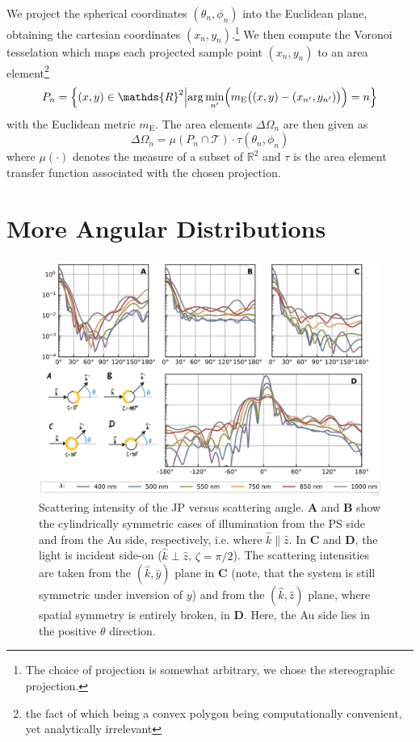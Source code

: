 \documentclass[10pt]{article}
\begin{document}
We project the spherical coordinates $\left( \theta_n, \phi_n \right)$ into the Euclidean plane, obtaining the cartesian coordinates $(x_n, y_n)$.\footnote{The choice of projection is somewhat arbitrary, we chose the stereographic projection.} 
We then compute the Voronoi tesselation which maps each projected sample point $(x_n, y_n)$ to an area element\footnote{the fact of which being a convex polygon being computationally convenient, yet analytically irrelevant} 
$$
P_n = \left\lbrace 
(x,y) \in \mathds{R}^2 
\middle\vert 
\mathrm{arg}\min\limits_{n'} \Bigl( m_\mathrm{E}\bigl( (x,y)-(x_{n'},y_{n'}) \bigr) \Bigr)
= n
\right\rbrace
$$ 
with the Euclidean metric $m_\mathrm{E}$. 
The area elements $\Delta\Omega_n$ are then given as 
$$
\Delta\Omega_n
=
\mu\left(
P_n \cap \mathcal{T}
\right) \cdot \tau\left( \theta_n, \phi_n \right)
$$
where $\mu(\cdot)$ denotes the measure of a subset of $\mathds{R}^2$ and $\tau$ is the area element transfer function associated with the chosen projection. 









\section*{More Angular Distributions}

\begin{figure}[b!]
    \centering
    \includegraphics[width=\textwidth]{[fig] cartesian mieplots (placeholder).jpg}
    \caption{Scattering intensity of the JP versus scattering angle. 
    {\sffamily\bfseries A} and {\sffamily\bfseries B} show the cylindrically symmetric cases of illumination from the PS side and from the Au side, respectively, i.e. where $\hat{k}\parallel\hat{z}$. 
    In {\sffamily\bfseries C} and {\sffamily\bfseries D}, the light is incident side-on ($\hat{k}\perp\hat{z}$, $\zeta=\pi/2$).
    The scattering intensities are taken from the $(\hat{k},\hat{y})$ plane in {\sffamily\bfseries C} (note, that the system is still symmetric under inversion of $y$) and from the $(\hat{k},\hat{z})$ plane, where spatial symmetry is entirely broken, in {\sffamily\bfseries D}.
    Here, the Au side lies in the positive $\theta$ direction.  
    }
    \label{fig:jp-mieplots}
\end{figure}
\end{document}
